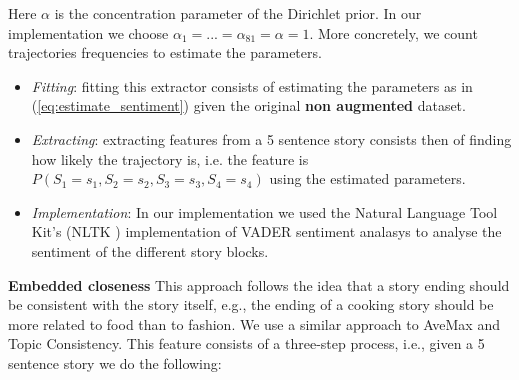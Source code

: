 \documentclass{article}
\begin{document}
Here $\alpha$ is the concentration parameter of the Dirichlet prior. In our
implementation we choose $\alpha_1 = ... = \alpha_{81} = \alpha = 1$.
More concretely, we count trajectories frequencies to estimate the parameters.

\begin{itemize}
	\item \textit{Fitting}: fitting this extractor consists of estimating the parameters as in (\ref{eq:estimate_sentiment}) given the original \textbf{non augmented} dataset.
	\item \textit{Extracting}: extracting features from a 5 sentence story consists then of finding how likely the trajectory is, i.e. the feature is $P(S_1 = s_1, S_2=s_2, S_3=s_3, S_4=s_4)$ using the estimated parameters.
	\item \textit{Implementation}: In our implementation we used the Natural Language Tool Kit's (NLTK \cite{NLTK_VADER}) implementation of VADER sentiment analasys \cite{VADER} to analyse the sentiment of the different story blocks.
\end{itemize}

\textbf{Embedded closeness} This approach follows the idea that a story ending
should be consistent with the story itself, e.g., the ending of a cooking story
should be more related to food than to fashion. We use a similar approach to
AveMax\cite{LSTMClassifier} and Topic Consistency\cite{COGCOMP}. This feature
consists of a three-step process, i.e., given a 5 sentence story we do the
following:
\end{document}
